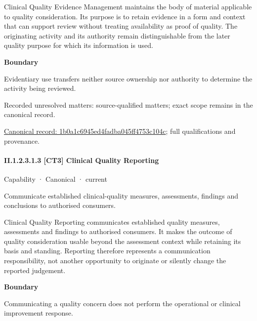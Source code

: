 Clinical Quality Evidence Management maintains the body of material applicable to quality consideration. Its purpose is to retain evidence in a form and context that can support review without treating availability as proof of quality. The originating activity and its authority remain distinguishable from the later quality purpose for which its information is used.



\textbf{Boundary}



Evidentiary use transfers neither source ownership nor authority to determine the activity being reviewed.


{\small Recorded unresolved matters: source-qualified matters; exact scope remains in the canonical record.}\par
{\footnotesize \href{../../../../continuum/strategy/capability/1b0a1c6945ed4fadba045ff4753c104c.md}{Canonical record: 1b0a1c6945ed4fadba045ff4753c104c}; full qualifications and provenance.}\par
\paragraph*{II.1.2.3.1.3 [CT3] Clinical Quality Reporting}
\label{navigation:II.1.2.3.1.3}

\label{element:70f34839c23042d59469e6ef96944057}
{\small Capability · Canonical · current}\par

Communicate established clinical-quality measures, assessments, findings and conclusions to authorised consumers.



Clinical Quality Reporting communicates established quality measures, assessments and findings to authorised consumers. It makes the outcome of quality consideration usable beyond the assessment context while retaining its basis and standing. Reporting therefore represents a communication responsibility, not another opportunity to originate or silently change the reported judgement.



\textbf{Boundary}



Communicating a quality concern does not perform the operational or clinical improvement response.


